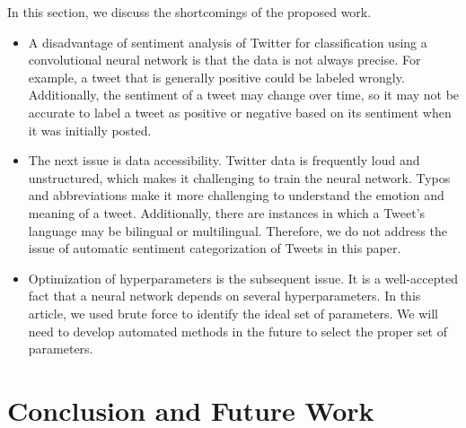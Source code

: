 In this section, we discuss the shortcomings of the proposed work. 
\begin{itemize}
\item A disadvantage of sentiment analysis of Twitter for classification using a convolutional neural network is that the data is not always precise. For example, a tweet that is generally positive could be labeled wrongly. Additionally, the sentiment of a tweet may change over time, so it may not be accurate to label a tweet as positive or negative based on its sentiment when it was initially posted.

\item The next issue is data accessibility.
Twitter data is frequently loud and unstructured, which makes it challenging to train the neural network.
Typos and abbreviations make it more challenging to understand the emotion and meaning of a tweet.
Additionally, there are instances in which a Tweet's language may be bilingual or multilingual.
Therefore, we do not address the issue of automatic sentiment categorization of Tweets in this paper. 

\item Optimization of hyperparameters is the subsequent issue. It is a well-accepted fact that a neural network depends on several hyperparameters. In this article, we used brute force to identify the ideal set of parameters. We will need to develop automated methods in the future to select the proper set of parameters. 
\end{itemize}


\section{Conclusion and Future Work}

